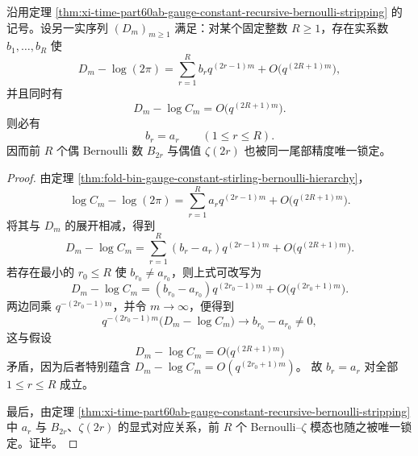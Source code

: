 \begin{theorem}\label{thm:xi-time-part60ab-gauge-constant-tail-rigidity}
沿用定理 \ref{thm:xi-time-part60ab-gauge-constant-recursive-bernoulli-stripping} 的记号。设另一实序列 \((D_m)_{m\ge 1}\) 满足：对某个固定整数 \(R\ge 1\)，存在实系数 \(b_1,\dots,b_R\) 使
\[
D_m-\log(2\pi)
=
\sum_{r=1}^{R}b_r q^{(2r-1)m}
+O\!\bigl(q^{(2R+1)m}\bigr),
\]
并且同时有
\[
D_m-\log C_m
=
O\!\bigl(q^{(2R+1)m}\bigr).
\]
则必有
\[
b_r=a_r
\qquad (1\le r\le R).
\]
因而前 \(R\) 个偶 Bernoulli 数 \(B_{2r}\) 与偶值 \(\zeta(2r)\) 也被同一尾部精度唯一锁定。
\end{theorem}
\begin{proof}
由定理 \ref{thm:fold-bin-gauge-constant-stirling-bernoulli-hierarchy}，
\[
\log C_m-\log(2\pi)
=
\sum_{r=1}^{R}a_r q^{(2r-1)m}
+O\!\bigl(q^{(2R+1)m}\bigr).
\]
将其与 \(D_m\) 的展开相减，得到
\[
D_m-\log C_m
=
\sum_{r=1}^{R}(b_r-a_r)q^{(2r-1)m}
+O\!\bigl(q^{(2R+1)m}\bigr).
\]
若存在最小的 \(r_0\le R\) 使 \(b_{r_0}\neq a_{r_0}\)，则上式可改写为
\[
D_m-\log C_m
=
(b_{r_0}-a_{r_0})q^{(2r_0-1)m}
+O\!\bigl(q^{(2r_0+1)m}\bigr).
\]
两边同乘 \(q^{-(2r_0-1)m}\)，并令 \(m\to\infty\)，便得到
\[
q^{-(2r_0-1)m}\bigl(D_m-\log C_m\bigr)\to b_{r_0}-a_{r_0}\neq 0,
\]
这与假设
\[
D_m-\log C_m
=
O\!\bigl(q^{(2R+1)m}\bigr)
\]
矛盾，因为后者特别蕴含
\(
D_m-\log C_m=O(q^{(2r_0+1)m})
\)。
故 \(b_r=a_r\) 对全部 \(1\le r\le R\) 成立。

最后，由定理 \ref{thm:xi-time-part60ab-gauge-constant-recursive-bernoulli-stripping} 中 \(a_r\) 与 \(B_{2r}\)、\(\zeta(2r)\) 的显式对应关系，前 \(R\) 个 Bernoulli--\(\zeta\) 模态也随之被唯一锁定。证毕。
\end{proof}

\endinput
